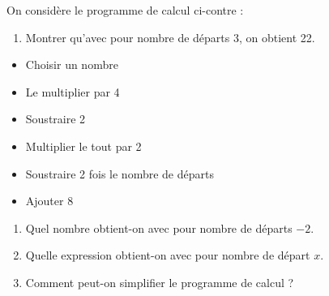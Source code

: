 \begin{minipage}[t]{0.65\textwidth}
    \vspace*{-1.5em}

    On considère le programme de calcul ci-contre :

    \begin{enumerate}
        \item Montrer qu'avec pour nombre de départs 3, on obtient 22.\vspace{2.2cm}
    \end{enumerate}
\end{minipage}
\hfil
\begin{minipage}[t]{0.32\textwidth}
    \begin{itemize}
        \item Choisir un nombre
        \item Le multiplier par 4
        \item Soustraire 2
        \item Multiplier le tout par 2
        \item Soustraire 2 fois le nombre de départs
        \item Ajouter 8
    \end{itemize}
\end{minipage}
\begin{enumerate}[start=2]
    \item Quel nombre obtient-on avec pour nombre de départs $-2$.\vspace{2.4cm}
    \item Quelle expression obtient-on avec pour nombre de départ $x$.\vspace{2.4cm}
    \item Comment peut-on simplifier le programme de calcul ?\vspace{2.4cm}
\end{enumerate}



